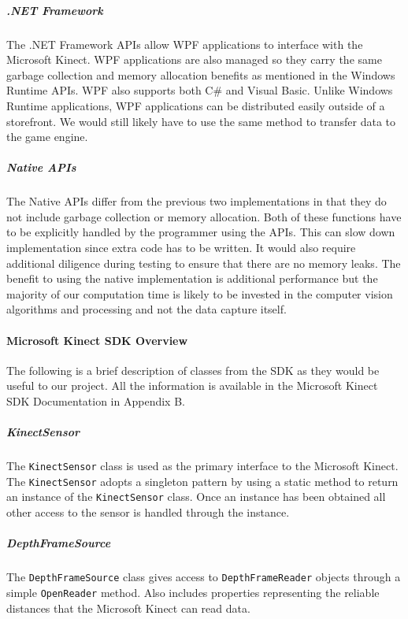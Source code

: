\documentclass[12pt]{article}
\begin{document}
\subparagraph{.NET Framework}\label{net-framework}

The .NET Framework APIs allow WPF applications to interface with the
Microsoft Kinect. WPF applications are also managed so they carry the
same garbage collection and memory allocation benefits as mentioned in
the Windows Runtime APIs. WPF also supports both C\# and Visual Basic.
Unlike Windows Runtime applications, WPF applications can be distributed
easily outside of a storefront. We would still likely have to use the
same method to transfer data to the game engine.

\subparagraph{Native APIs}\label{native-apis}

The Native APIs differ from the previous two implementations in that
they do not include garbage collection or memory allocation. Both of
these functions have to be explicitly handled by the programmer using
the APIs. This can slow down implementation since extra code has to be
written. It would also require additional diligence during testing to
ensure that there are no memory leaks. The benefit to using the native
implementation is additional performance but the majority of our
computation time is likely to be invested in the computer vision
algorithms and processing and not the data capture itself.

\paragraph{Microsoft Kinect SDK
Overview}\label{microsoft-kinect-sdk-overview}

The following is a brief description of classes from the SDK as they
would be useful to our project. All the information is available in the
Microsoft Kinect SDK Documentation in Appendix B.

\subparagraph{KinectSensor}\label{kinectsensor}

The \texttt{KinectSensor} class is used as the primary interface to the
Microsoft Kinect. The \texttt{KinectSensor} adopts a singleton pattern
by using a static method to return an instance of the
\texttt{KinectSensor} class. Once an instance has been obtained all
other access to the sensor is handled through the instance.

\subparagraph{DepthFrameSource}\label{depthframesource}

The \texttt{DepthFrameSource} class gives access to
\texttt{DepthFrameReader} objects through a simple \texttt{OpenReader}
method. Also includes properties representing the reliable distances
that the Microsoft Kinect can read data.
\end{document}
